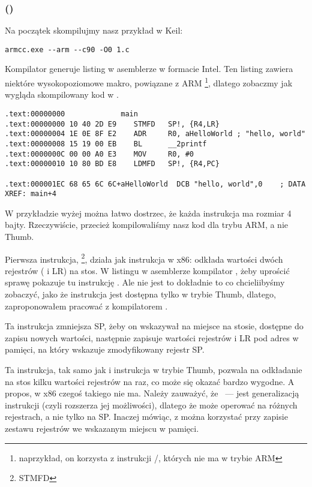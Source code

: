 \subsubsection{\NonOptimizingKeilVI (\ARMMode)}

Na początek skompilujmy nasz przykład w Keil:

\begin{lstlisting}
armcc.exe --arm --c90 -O0 1.c 
\end{lstlisting}

\myindex{\IntelSyntax}
Kompilator  generuje listing w asemblerze w formacie Intel.
Ten listing zawiera niektóre wysokopoziomowe makro, powiązane z ARM
\footnote{naprzykład, on korzysta z instrukcji \PUSH/\POP, których nie ma w trybie ARM},
dlatego zobaczmy jak wygląda skompilowany kod w \IDA.

\begin{lstlisting}[caption=\NonOptimizingKeilVI (\ARMMode) \IDA,style=customasmARM]
.text:00000000             main
.text:00000000 10 40 2D E9    STMFD   SP!, {R4,LR}
.text:00000004 1E 0E 8F E2    ADR     R0, aHelloWorld ; "hello, world"
.text:00000008 15 19 00 EB    BL      __2printf
.text:0000000C 00 00 A0 E3    MOV     R0, #0
.text:00000010 10 80 BD E8    LDMFD   SP!, {R4,PC}

.text:000001EC 68 65 6C 6C+aHelloWorld  DCB "hello, world",0    ; DATA XREF: main+4
\end{lstlisting}

W przykładzie wyżej można łatwo dostrzec, że każda instrukcja ma rozmiar 4 bajty.
Rzeczywiście, przecież kompilowaliśmy nasz kod dla trybu ARM, a nie Thumb.

Pierwsza instrukcja, \footnote{\ac{STMFD}},
działa jak instrukcja \PUSH w x86: odkłada wartości dwóch rejestrów ( i \ac{LR}) na stos.
W listingu w asemblerze kompilator , żeby uprościć sprawę pokazuje tu instrukcję
.
Ale nie jest to dokładnie to co chcieliibyśmy zobaczyć, jako że instrukcja \PUSH jest dostępna tylko w trybie Thumb, dlatego,
 zaproponowałem pracować z kompilatorem \IDA.

Ta instrukcja zmniejsza \ac{SP}, żeby on wskazywał na miejsce na stosie, dostępne do zapisu nowych wartości, następnie zapisuje wartości rejestrów  i \ac{LR} 
pod adres w pamięci, na który wskazuje zmodyfikowany rejestr \ac{SP}.

Ta instrukcja, tak samo jak i instrukcja \PUSH w trybie Thumb, pozwala na odkładanie na stos kilku wartości rejestrów na raz, co może się okazać bardzo wygodne.
A propos, w x86 czegoś takiego nie ma.
Należy zauważyć, że ~--- jest generalizacją instrukcji \PUSH (czyli rozszerza jej możliwości), dlatego że może operować na różnych rejestrach, a nie tylko na \ac{SP}.
Inaczej mówiąc, z  można korzystać przy zapisie zestawu rejestrów we wskazanym miejscu w pamięci.

